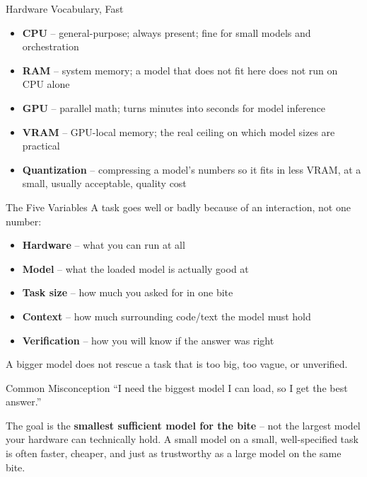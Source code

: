 \documentclass[aspectratio=169]{beamer}
\begin{document}
\begin{conceptframe}{Hardware Vocabulary, Fast}
  \begin{itemize}
    \item \textbf{CPU} -- general-purpose; always present; fine for small models and orchestration
    \item \textbf{RAM} -- system memory; a model that does not fit here does not run on CPU alone
    \item \textbf{GPU} -- parallel math; turns minutes into seconds for model inference
    \item \textbf{VRAM} -- GPU-local memory; the real ceiling on which model sizes are practical
    \item \textbf{Quantization} -- compressing a model's numbers so it fits in less VRAM, at a small, usually acceptable, quality cost
  \end{itemize}
\end{conceptframe}

\begin{conceptframe}{The Five Variables}
  A task goes well or badly because of an interaction, not one number:

  \begin{itemize}
    \item \textbf{Hardware} -- what you can run at all
    \item \textbf{Model} -- what the loaded model is actually good at
    \item \textbf{Task size} -- how much you asked for in one bite
    \item \textbf{Context} -- how much surrounding code/text the model must hold
    \item \textbf{Verification} -- how you will know if the answer was right
  \end{itemize}

  \vspace{2mm}
  A bigger model does not rescue a task that is too big, too vague, or unverified.
\end{conceptframe}

\begin{misconceptionframe}{Common Misconception}
  ``I need the biggest model I can load, so I get the best answer.''

  \vspace{3mm}
  The goal is the \textbf{smallest sufficient model for the bite} --
  not the largest model your hardware can technically hold. A small
  model on a small, well-specified task is often faster, cheaper, and
  just as trustworthy as a large model on the same bite.
\end{misconceptionframe}
\end{document}
